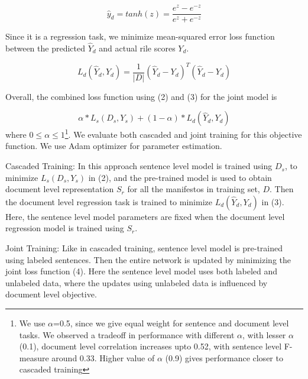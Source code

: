 \documentclass[11pt,a4paper]{article}
\begin{document}
\[ \hat{y}_{d} = tanh(z) = \frac{e^z - e^{-z}}{e^z + e^{-z}} \]

Since it is a regression task, we minimize mean-squared error loss function between the predicted $\hat{Y}_{d}$ and actual rile scores $Y_{d}$.

\begin{equation}
L_{d}(\hat{Y}_{d}, Y_{d}) = \frac{1}{|D|}  (\hat{Y}_{d} - Y_{d})^T (\hat{Y}_{d} - Y_{d})
\end{equation}

Overall, the combined loss function using (2) and (3) for the joint model is 

\begin{equation}
 \alpha * L_{s}(D_{s},Y_{s}) + (1-\alpha) * L_{d}(\hat{Y}_{d}, Y_{d})
\end{equation}
where $0 \le \alpha \le 1$\footnote{We use $\alpha$=0.5, since we give equal weight for sentence and document level tasks. We observed a tradeoff in performance with different $\alpha$, with lesser $\alpha$ (0.1), document level correlation increases upto 0.52, with sentence level F-measure around 0.33. Higher value of $\alpha$ (0.9) gives performance closer to cascaded training}.
We evaluate both cascaded and joint training for this objective function. We use Adam optimizer \cite{DBLP:journals/corr/KingmaB14} for parameter estimation. 
\begin{description}
\item{Cascaded Training:} In this approach sentence level model is trained using $D_{s}$, to minimize $L_{s}(D_{s},Y_{s})$ in (2), and the pre-trained model is used to obtain document level representation $S_{r}$ for all the manifestos in training set, $D$. Then the document level regression task is trained to minimize $L_{d}(\hat{Y}_{d}, Y_{d})$ in (3). Here, the sentence level model parameters are fixed when the document level regression model is trained using $S_{r}$.

\item{Joint Training:} Like in cascaded training, sentence level model is pre-trained using labeled sentences. Then the entire network is updated by minimizing the joint loss function (4). Here the sentence level model uses both labeled and unlabeled data, where the updates using unlabeled data is influenced by document level objective.
\end{description}
\end{document}
